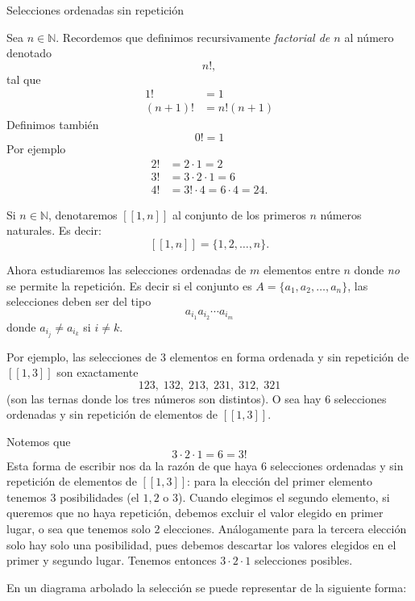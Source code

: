\begin{section}{Selecciones ordenadas sin repetición}\label{seccion-selecciones-ordenadas-sin-repeticion}

Sea $n \in \mathbb{N}$. Recordemos  que  definimos recursivamente \emph{factorial de $n$} al número denotado 
$$n!,$$
tal que
\begin{align*}
1! &= 1\\
(n + 1)! &= n!  (n + 1)
\end{align*}
Definimos también
$$0! = 1$$
Por ejemplo
\begin{align*}
2! &= 2 \cdot 1 = 2 \\
3! &= 3 \cdot 2 \cdot 1 = 6 \\
4! &= 3!\cdot 4 = 6 \cdot 4 = 24. 
\end{align*}

Si  $n \in \mathbb N$, denotaremos  $[[ 1 , n]]$ al conjunto de los primeros $n$ números naturales. Es decir:
$$
 [[ 1 , n]] = \{ 1, 2, \ldots,n\}.
$$  

Ahora estudiaremos las selecciones ordenadas de $m$ elementos entre $n$ donde {\em no} se permite la repetición. Es decir si  el conjunto es $A= \{a_1,a_2,\ldots,a_n\}$, las selecciones deben ser del tipo 
$$
a_{i_1} a_{i_2} \cdots a_{i_m}
$$
donde  $a_{i_j} \not= a_{i_k}$ si $i\not=k$. 

Por ejemplo, las selecciones de $3$ elementos en forma ordenada y sin repetición de $[[1, 3]]$  son exactamente
$$
1 2 3,\; 1 3 2,\; 2 1 3,\; 2 3 1,\; 3 1 2,\; 3 2 1
$$
(son las ternas donde los tres números son distintos). O sea hay $6$ selecciones ordenadas y sin repetición de  elementos de $[[1, 3]]$.

Notemos que
$$
3 \cdot 2 \cdot 1 = 6 = 3!
$$
Esta forma de escribir nos da la razón de que haya $6$ selecciones ordenadas y sin repetición de  elementos de $[[1, 3]]$: para la elección del primer elemento tenemos $3$ posibilidades (el $1, 2$ o $3$). Cuando elegimos el segundo elemento, si queremos que no haya repetición, debemos excluir el valor elegido en primer lugar, o sea que tenemos solo $2$ elecciones. Análogamente para la tercera elección solo hay solo una posibilidad, pues debemos descartar los valores elegidos en el primer y segundo lugar. Tenemos entonces  $3 \cdot 2 \cdot 1$ selecciones posibles.

En un diagrama arbolado la selección se puede representar de la siguiente forma:


\end{section}
